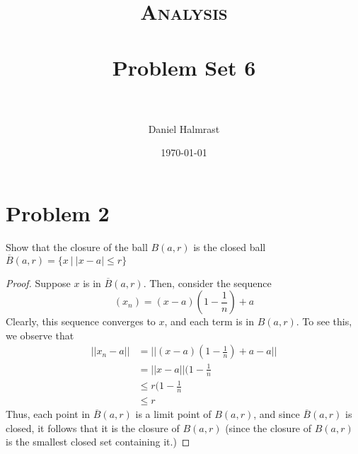 \documentclass[fontsize=11pt]{scrartcl} %
\title{	
\normalfont \normalsize 
\textsc{Analysis} \\ [25pt] %
\horrule{0.5pt} \\[0.4cm] %
\huge Problem Set 6\\ %
\horrule{2pt} \\[0.5cm] %
}
\author{Daniel Halmrast} %
\date{\normalsize\today} %
\numberwithin{equation}{section} %
\numberwithin{figure}{section} %
\numberwithin{table}{section} %
\begin{document}
\maketitle %


\section*{Problem 2}
Show that the closure of the ball $B(a,r)$ is the closed ball $\overline{B}(a,r)=\{x\ |\ |x-a|\leq r\}$
\\
\begin{proof}
Suppose $x$ is in $\overline{B}(a,r)$. Then, consider the sequence
\[
(x_n) = (x-a)(1-\frac{1}{n}) + a
\]
Clearly, this sequence converges to $x$, and each term is in $B(a,r)$.
To see this, we observe that
\[
\begin{aligned}
||x_n-a|| &= ||(x-a)(1-\frac{1}{n}) + a - a||\\
          &= ||x-a||(1-\frac{1}{n}\\
            &\leq r(1-\frac{1}{n}\\
            &\leq r
\end{aligned}
\]
Thus, each point in $\overline{B}(a,r)$ is a limit point of $B(a,r)$, and since
$\overline{B}(a,r)$ is closed, it follows that it is the closure of $B(a,r)$ (since the 
closure of $B(a,r)$ is the smallest closed set containing it.)
\end{proof}


\end{document}
